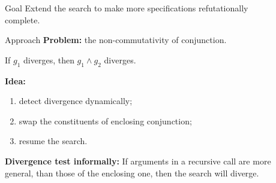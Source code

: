 \documentclass[final,20pt]{beamer}
\begin{document}
\begin{frame}[t]
\begin{columns}[t]
\begin{column}{\onecolwid}
  \end{column}

  \begin{column}{\sepwid}\end{column} %

  \begin{column}{\onecolwid} %
  
  
       \begin{alertblock}{Goal}
         Extend the search to make more specifications refutationally complete.
       \end{alertblock}
  
    \begin{block}{Approach}
      \vskip8mm
      \textbf{Problem:} the non-commutativity of conjunction.
      
      \begin{figure}
      \end{figure}
      
      If $g_1$ diverges, then $g_1 \wedge g_2$ diverges. 
      \vskip8mm
     
      \textbf{Idea:}
      	\begin{enumerate}
      	\justifying
      	\item detect divergence dynamically;
      	\item swap the constituents of enclosing conjunction;
      	\item resume the search.
      	\end{enumerate}
      
      \vskip8mm
      \textbf{Divergence test informally:}
      \vskip8mm
      If arguments in a recursive call are more general, than those of the enclosing one, then the search will diverge.
      

\end{block}
\end{column}
\end{columns}
\end{frame}
\end{document}
